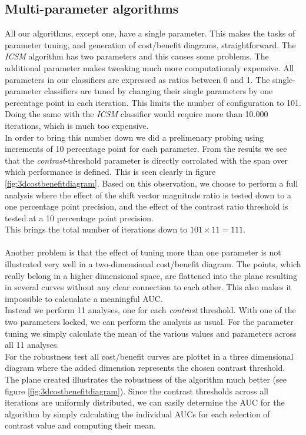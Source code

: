 \subsection{Multi-parameter algorithms}\label{sec:ph1multiparameter}
%
All our algorithms, except one, have a single parameter. This makes the tasks of parameter tuning, and generation of cost/benefit diagrams, straightforward. The \textit{ICSM} algorithm has two parameters and this causes some problems. The additional parameter makes tweaking much more computationaly expensive. All parameters in our classifiers are expressed as ratios between 0 and 1. The single-parameter classifiers are tuned by changing their single parameters by one percentage point in each iteration. This limits the number of configuration to 101. Doing the same with the \textit{ICSM} classifier would require more than 10.000 iterations, which is much too expensive.\\
In order to bring this number down we did a prelimenary probing using increments of 10 percentage point for each parameter. From the results we see that the \textit{contrast}-threshold parameter is directly corrolated with the span over which performance is defined. This is seen clearly in figure \ref{fig:3dcostbenefitdiagram}. Based on this observation, we choose to perform a full analysis where the effect of the shift vector magnitude ratio is tested down to a one percentage point precision, and the effect of the contrast ratio threshold is tested at a 10 percentage point precision.\\
This brings the total number of iterations down to $101 \times 11 = 111$.\\
\\
Another problem is that the effect of tuning more than one parameter is not illustrated very well in a two-dimensional cost/benefit diagram. The points, which really belong in a higher dimensional space, are flattened into the plane resulting in several curves without any clear connection to each other. This also makes it impossible to calcualate a meaningful AUC.\\
Instead we perform 11 analyses, one for each \textit{contrast} threshold. With one of the two parameters locked, we can perform the analysis as usual. For the parameter tuning we simply calculate the mean of the various values and parameters across all 11 analyses.\\
For the robustness test all cost/benefit curves are plottet in a three dimensional diagram where the added dimension represents the chosen contrast threshold. The plane created illustrates the robustness of the algorithm much better (see figure \ref{fig:3dcostbenefitdiagram}). Since the contrast thresholds across all iterations are uniformly distributed, we can easily determine the AUC for the algorithm by simply calculating the individual AUCs for each selection of contrast value and computing their mean.
